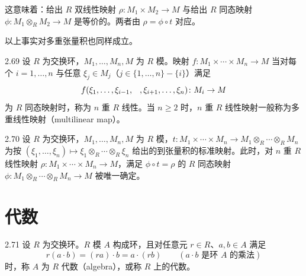
这意味着：给出 $R$ 双线性映射 $\rho\colon M_1\times M_2\to M$ 与给出 $R$ 同态映射 $\phi\colon M_1\otimes_R M_2\to M$ 是等价的。两者由 $\rho=\phi\circ t$ 对应。

以上事实对多重张量积也同样成立。

\begin{definition}{2.69} 设 $R$ 为交换环，$M_1,\ldots,M_n,M$ 为 $R$ 模。映射 $f\colon M_1\times\cdots\times M_n\to M$ 当对每个 $i=1,\ldots,n$ 与任意 $\xi_j\in M_j$（$j\in\{1,\ldots,n\}-\{i\}$）满足
\[
  f(\xi_1,\ldots,\xi_{i-1},\hphantom{\xi_i},\xi_{i+1},\ldots,\xi_n)\colon M_i\to M
\]
为 $R$ 同态映射时，称为 $n$ 重 $R$ 线性。当 $n\ge2$ 时，$n$ 重 $R$ 线性映射一般称为多重线性映射（multilinear map）。\end{definition}


\begin{proposition}{2.70} 设 $R$ 为交换环，$M_1,\ldots,M_n,M$ 为 $R$ 模，$t\colon M_1\times\cdots\times M_n\to M_1\otimes_R\cdots\otimes_R M_n$ 为按 $(\xi_1,\ldots,\xi_n)\mapsto\xi_1\otimes_R\cdots\otimes_R\xi_n$ 给出的到张量积的标准映射。此时，对 $n$ 重 $R$ 线性映射 $\rho\colon M_1\times\cdots\times M_n\to M$，满足 $\phi\circ t=\rho$ 的 $R$ 同态映射 $\phi\colon M_1\otimes_R\cdots\otimes_R M_n\to M$ 被唯一确定。\end{proposition}


\section{代数}

\begin{definition}{2.71} 设 $R$ 为交换环。$R$ 模 $A$ 构成环，且对任意元 $r\in R$、$a,b\in A$ 满足
\[
  r(a\cdot b)=(ra)\cdot b=a\cdot(rb)\qquad (a\cdot b \text{ 是环 } A \text{ 的乘法})
\]
时，称 $A$ 为 $R$ 代数（algebra），或称 $R$ 上的代数。\end{definition}

